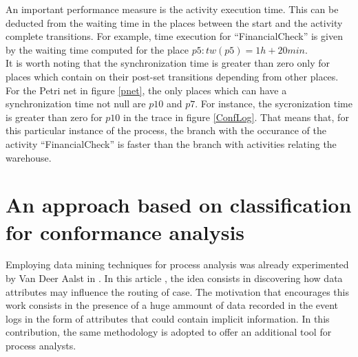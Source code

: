 \documentclass[11pt]{article}
\begin{document}
An important performance measure is the activity execution time. This can be deducted from the waiting time in the places between the start and the activity complete transitions. For example, time execution for ``FinancialCheck'' is given by the waiting time computed for the place $p5: tw(p5)=1h+20min$.\\

It is worth noting that the synchronization time is greater than zero only for places which contain on their post-set transitions depending from other places. For the Petri net in figure \ref{pnet}, the only places which can have a synchronization time not null are $p10$ and $p7$. For instance, the sycronization time is greater than zero for $p10$ in the trace in figure \ref{ConfLog}. That means that, for this particular instance of the process, the branch with the occurance of the activity ``FinancialCheck'' is faster than the branch with activities relating the warehouse.

\section{An approach based on classification for conformance analysis}

 

Employing data mining techniques for process analysis was already experimented by Van Deer Aalst in \cite{decision mining in business process}. In this article \cite{}, the idea consists in discovering how data attributes may influence the routing of case. The motivation that encourages this work consists in the presence of a huge ammount of data recorded in the event logs in the form of attributes that could contain implicit information. In this contribution, the same methodology is adopted to offer an additional tool for process analysts.\\
\end{document}
